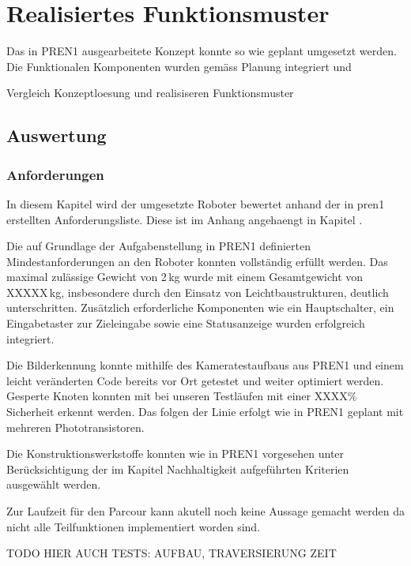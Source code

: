 \section{Realisiertes Funktionsmuster}

Das in PREN1 ausgearbeitete Konzept konnte so wie geplant umgesetzt werden. Die Funktionalen Komponenten wurden gemäss Planung integriert und 

Vergleich  Konzeptloesung und realisiseren Funktionsmuster



\subsection{Auswertung}

\subsubsection{Anforderungen}

In diesem Kapitel wird der umgesetzte Roboter bewertet anhand der in \acrshort{pren1} erstellten Anforderungsliste. Diese ist im Anhang angehaengt in Kapitel .

Die auf Grundlage der Aufgabenstellung in PREN1 definierten Mindestanforderungen an den Roboter konnten vollständig erfüllt werden. Das maximal zulässige Gewicht von 2 kg wurde mit einem Gesamtgewicht von XXXXX kg, insbesondere durch den Einsatz von Leichtbaustrukturen, deutlich unterschritten. Zusätzlich erforderliche Komponenten wie ein Hauptschalter, ein Eingabetaster zur Zieleingabe sowie eine Statusanzeige wurden erfolgreich integriert.

Die Bilderkennung konnte mithilfe des Kameratestaufbaus aus PREN1 und einem leicht veränderten Code bereits vor Ort getestet und weiter optimiert werden. Gesperte Knoten konnten mit bei unseren Testläufen mit einer XXXX\% Sicherheit erkennt werden. Das folgen der Linie erfolgt wie in PREN1 geplant mit mehreren Phototransistoren. 

Die Konstruktionswerkstoffe konnten wie in PREN1 vorgesehen unter Berücksichtigung der im Kapitel Nachhaltigkeit aufgeführten Kriterien ausgewählt werden.

Zur Laufzeit für den Parcour kann akutell noch keine Aussage gemacht werden da nicht alle Teilfunktionen implementiert worden sind. 



TODO HIER AUCH TESTS: AUFBAU, TRAVERSIERUNG ZEIT
